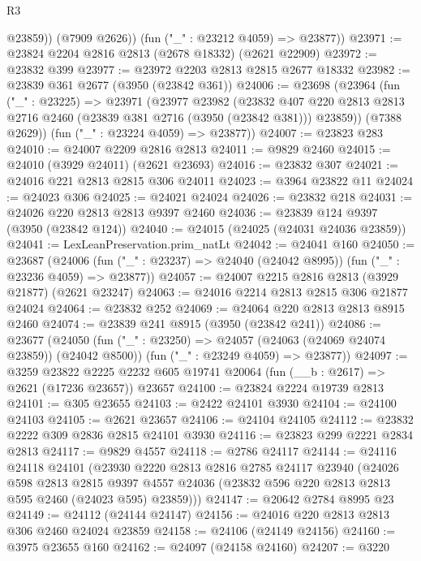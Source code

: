 \begin{lexlean}{R3}
\begin{coremodule}
            @23859))
        (@7909 @2626))
      (fun ("_" : @23212 @4059) => @23877))
@23971 := @23824 @2204 @2816 @2813 (@2678 @18332) (@2621 @22909)
@23972 := @23832 @399
@23977 := @23972 @2203 @2813 @2815 @2677 @18332
@23982 := @23839 @361 @2677 (@3950 (@23842 @361))
@24006 := @23698
    (@23964
      (fun ("_" : @23225) =>
      @23971
        (@23977
          @23982
          (@23832
            @407
            @220
            @2813
            @2813
            @2716
            @2460
            (@23839 @381 @2716 (@3950 (@23842 @381)))
            @23859))
        (@7388 @2629))
      (fun ("_" : @23224 @4059) => @23877))
@24007 := @23823 @283
@24010 := @24007 @2209 @2816 @2813
@24011 := @9829 @2460
@24015 := @24010 (@3929 @24011) (@2621 @23693)
@24016 := @23832 @307
@24021 := @24016 @221 @2813 @2815 @306 @24011
@24023 := @3964 @23822 @11
@24024 := @24023 @306
@24025 := @24021 @24024
@24026 := @23832 @218
@24031 := @24026 @220 @2813 @2813 @9397 @2460
@24036 := @23839 @124 @9397 (@3950 (@23842 @124))
@24040 := @24015 (@24025 (@24031 @24036 @23859))
@24041 := LexLeanPreservation.prim_natLt
@24042 := @24041 @160
@24050 := @23687
    (@24006 (fun ("_" : @23237) => @24040 (@24042 @8995)) (fun ("_" : @23236 @4059) => @23877))
@24057 := @24007 @2215 @2816 @2813 (@3929 @21877) (@2621 @23247)
@24063 := @24016 @2214 @2813 @2815 @306 @21877 @24024
@24064 := @23832 @252
@24069 := @24064 @220 @2813 @2813 @8915 @2460
@24074 := @23839 @241 @8915 (@3950 (@23842 @241))
@24086 := @23677
    (@24050
      (fun ("_" : @23250) => @24057 (@24063 (@24069 @24074 @23859)) (@24042 @8500))
      (fun ("_" : @23249 @4059) => @23877))
@24097 := @3259
    @23822
    @2225
    @2232
    @605
    @19741
    @20064
    (fun (__b : @2617) => @2621 (@17236 @23657))
    @23657
@24100 := @23824 @2224 @19739 @2813
@24101 := @305 @23655
@24103 := @2422 @24101 @3930
@24104 := @24100 @24103
@24105 := @2621 @23657
@24106 := @24104 @24105
@24112 := @23832 @2222 @309 @2836 @2815 @24101 @3930
@24116 := @23823 @299 @2221 @2834 @2813
@24117 := @9829 @4557
@24118 := @2786 @24117
@24144 := @24116
    @24118
    @24101
    (@23930
      @2220
      @2813
      @2816
      @2785
      @24117
      @23940
      (@24026
        @598
        @2813
        @2815
        @9397
        @4557
        @24036
        (@23832 @596 @220 @2813 @2813 @595 @2460 (@24023 @595) @23859)))
@24147 := @20642 @2784 @8995 @23
@24149 := @24112 (@24144 @24147)
@24156 := @24016 @220 @2813 @2813 @306 @2460 @24024 @23859
@24158 := @24106 (@24149 @24156)
@24160 := @3975 @23655 @160
@24162 := @24097 (@24158 @24160)
@24207 := @3220

\end{coremodule}
\end{lexlean}
